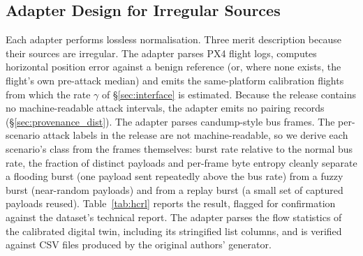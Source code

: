 \subsection{Adapter Design for Irregular Sources}
Each adapter performs lossless normalisation. Three merit description because
their sources are irregular. The  adapter parses PX4
flight logs, computes horizontal position error against a benign reference (or,
where none exists, the flight's own pre-attack median) and emits the
same-platform calibration flights from which the rate $\gamma$ of
\S\ref{sec:interface} is estimated. Because the release contains no
machine-readable attack intervals, the adapter emits no
 pairing records (\S\ref{sec:provenance_dist}).
The  adapter parses candump-style bus frames. The
per-scenario attack labels in the release are not machine-readable, so we derive
each scenario's class from the frames themselves: burst rate relative to the
normal bus rate, the fraction of distinct payloads and per-frame byte entropy
cleanly separate a flooding burst (one payload sent repeatedly above the bus
rate) from a fuzzy burst (near-random payloads) and from a replay burst (a small
set of captured payloads reused). Table~\ref{tab:hcrl} reports the result,
flagged for confirmation against the dataset's technical report. The
 adapter parses the flow statistics of the calibrated digital
twin, including its stringified list columns, and is verified against CSV files
produced by the original authors' generator.

\begin{table}[t]
\centering
\caption{The corpus as actually ingested. Counts come from schema-validated
adapter outputs; every record validates against the schema of
\S\ref{sec:schema}.}
\label{tab:ingest}
\small
\renewcommand{\arraystretch}{1.1}

\end{table}

\begin{table}[t]
\centering
\caption{Attack classes derived from the frames of the 
scenarios, inferred from burst rate, share of distinct payloads and byte
entropy; scenarios that exhibit more than one burst shape map to
.}
\label{tab:hcrl}
\small
\renewcommand{\arraystretch}{1.05}

\end{table}

